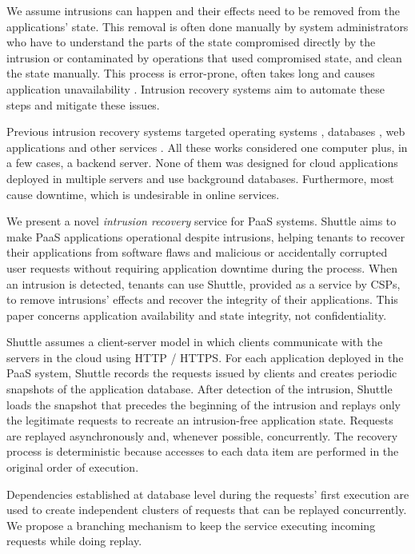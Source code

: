 We  assume intrusions can happen and their effects need to be removed from the applications' state. This removal is often done manually by system administrators who have to understand the parts of the state compromised directly by the intrusion or contaminated by operations that used compromised state, and clean the state manually. This process is error-prone, often takes long and causes application unavailability \cite{Brown2001}. Intrusion recovery systems aim to automate these steps and mitigate these issues.

Previous intrusion recovery systems targeted operating systems \cite{taser,retro,dare}, databases \cite{itdb,phoenix}, web applications \cite{Akkus2010,warp,aire} and other services \cite{undoForOperators}. All these works considered one computer plus, in a few cases, a backend server. None of them was designed for cloud applications deployed in multiple servers and use background databases. Furthermore, most cause downtime, which is undesirable in online services.

We present a novel \emph{intrusion recovery} service for \ac{PaaS} systems. Shuttle aims to make \ac{PaaS} applications operational despite intrusions, helping tenants to recover their applications from software flaws and malicious or accidentally corrupted user requests without requiring application downtime during the process. When an intrusion is detected, tenants can use Shuttle, provided as a service by CSPs, to remove intrusions' effects and recover the integrity of their applications. This paper concerns application availability and state integrity, not confidentiality.

Shuttle assumes a client-server model in which clients communicate with the servers in the cloud using HTTP / HTTPS. For each application deployed in the \ac{PaaS} system, Shuttle records the requests issued by clients and creates periodic snapshots of the application database. 
After detection of the intrusion, Shuttle loads the snapshot that precedes the beginning of the intrusion and replays only the legitimate requests to recreate an intrusion-free application state. Requests are replayed asynchronously and, whenever possible, concurrently. The recovery process is deterministic because accesses to each data item are performed in the original order of execution.

Dependencies established at database level during the requests' first execution are used to create independent clusters of requests that can be replayed concurrently. We propose a branching mechanism to keep the service executing incoming requests while doing replay.

